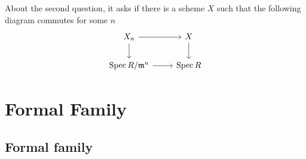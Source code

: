 \documentclass{ctexart}
\newcommand{\spec}{\operatorname{Spec}}
\begin{document}
\vspace{-\baselineskip} %
About the second question, it asks if there is a scheme $X$ such that the following diagram commutes for some $n$
\begin{equation}
    \begin{tikzcd}
        X_{n} \arrow[r] \arrow[d] &
        X \arrow[d] \\
        \spec R/\mathfrak{m}^{n} \arrow[r] &
        \spec R
    \end{tikzcd}
\end{equation}

\section{Formal Family}
\label{section:Formal_Family}

\subsection{Formal family}
\label{subsection:Formal_Family_Formal_family}
\end{document}
